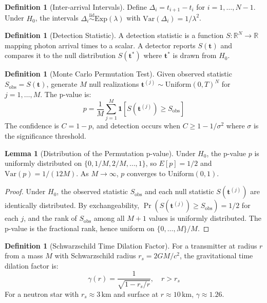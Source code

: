 \documentclass[11pt]{article}
\theoremstyle{definition}
\newtheorem{lemma}[theorem]{Lemma}
\newtheorem{definition}[theorem]{Definition}
\begin{document}
\begin{definition}[Inter-arrival Intervals]
Define $\Delta_i = t_{i+1} - t_i$ for $i = 1, \ldots, N-1$. Under $H_0$, the intervals $\Delta_i \stackrel{\text{iid}}{\sim} \mathrm{Exp}(\lambda)$ with $\mathrm{Var}(\Delta_i) = 1/\lambda^2$.
\end{definition}

\begin{definition}[Detection Statistic]
A detection statistic is a function $S: \mathbb{R}^N \to \mathbb{R}$ mapping photon arrival times to a scalar. A detector reports $S(\mathbf{t})$ and compares it to the null distribution $S(\mathbf{t}^{\ast})$ where $\mathbf{t}^{\ast}$ is drawn from $H_0$.
\end{definition}

\begin{definition}[Monte Carlo Permutation Test]
Given observed statistic $S_{\text{obs}} = S(\mathbf{t})$, generate $M$ null realizations $\mathbf{t}^{(j)} \sim \mathrm{Uniform}(0, T)^N$ for $j = 1, \ldots, M$. The p-value is:
\begin{equation}
p = \frac{1}{M} \sum_{j=1}^{M} \mathbf{1}\left[S(\mathbf{t}^{(j)}) \ge S_{\text{obs}}\right]
\end{equation}
The confidence is $C = 1 - p$, and detection occurs when $C \ge 1 - 1/\sigma^2$ where $\sigma$ is the significance threshold.
\end{definition}

\begin{lemma}[Distribution of the Permutation p-value]
\label{lemma:pvalue}
Under $H_0$, the p-value $p$ is uniformly distributed on $\{0, 1/M, 2/M, \ldots, 1\}$, so $E[p] = 1/2$ and $\mathrm{Var}(p) = 1/(12M)$. As $M \to \infty$, $p$ converges to $\mathrm{Uniform}(0,1)$.
\end{lemma}

\begin{proof}
Under $H_0$, the observed statistic $S_{\text{obs}}$ and each null statistic $S(\mathbf{t}^{(j)})$ are identically distributed. By exchangeability, $\Pr(S(\mathbf{t}^{(j)}) \ge S_{\text{obs}}) = 1/2$ for each $j$, and the rank of $S_{\text{obs}}$ among all $M+1$ values is uniformly distributed. The p-value is the fractional rank, hence uniform on $\{0, \ldots, M\}/M$.
\end{proof}

\begin{definition}[Schwarzschild Time Dilation Factor]
For a transmitter at radius $r$ from a mass $M$ with Schwarzschild radius $r_s = 2GM/c^2$, the gravitational time dilation factor is:
\begin{equation}
\gamma(r) = \frac{1}{\sqrt{1 - r_s/r}}, \quad r > r_s
\end{equation}
For a neutron star with $r_s \approx 3\,\text{km}$ and surface at $r \approx 10\,\text{km}$, $\gamma \approx 1.26$.
\end{definition}
\end{document}
